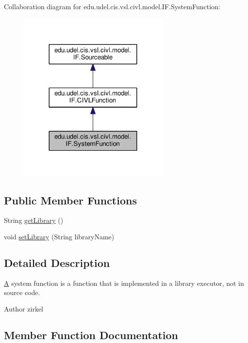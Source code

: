 Collaboration diagram for edu.\+udel.\+cis.\+vsl.\+civl.\+model.\+I\+F.\+System\+Function\+:
\nopagebreak
\begin{figure}[H]
\begin{center}
\leavevmode
\includegraphics[width=215pt]{interfaceedu_1_1udel_1_1cis_1_1vsl_1_1civl_1_1model_1_1IF_1_1SystemFunction__coll__graph}
\end{center}
\end{figure}
\subsection*{Public Member Functions}
\begin{DoxyCompactItemize}
\item 
String \hyperlink{interfaceedu_1_1udel_1_1cis_1_1vsl_1_1civl_1_1model_1_1IF_1_1SystemFunction_aebc02c65261fb1c1bc2fcbf1df30960f}{get\+Library} ()
\item 
void \hyperlink{interfaceedu_1_1udel_1_1cis_1_1vsl_1_1civl_1_1model_1_1IF_1_1SystemFunction_a5dce4243b431266c6083e5d1a958e01e}{set\+Library} (String library\+Name)
\end{DoxyCompactItemize}


\subsection{Detailed Description}
\hyperlink{structA}{A} system function is a function that is implemented in a library executor, not in source code. 

\begin{DoxyAuthor}{Author}
zirkel 
\end{DoxyAuthor}


\subsection{Member Function Documentation}
\hypertarget{interfaceedu_1_1udel_1_1cis_1_1vsl_1_1civl_1_1model_1_1IF_1_1SystemFunction_aebc02c65261fb1c1bc2fcbf1df30960f}{}
